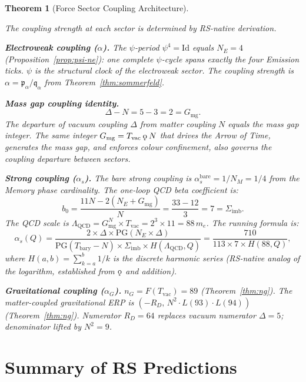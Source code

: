 \documentclass[11pt,letterpaper]{article}
\theoremstyle{plain}
\newtheorem{theorem}{Theorem}[section]
\theoremstyle{definition}
\theoremstyle{remark}
\newcommand{\koppa}{\mathbin{\text{\rm\k{o}}}}
\newcommand{\Tbary}{T_{\mathrm{bary}}}
\newcommand{\Sigimb}{\Sigma_{\mathrm{imb}}}
\newcommand{\PG}{\mathrm{PG}}
\newcommand{\Gmg}{G_{\mathrm{mg}}}
\newcommand{\Tvac}{T_{\mathrm{vac}}}
\newcommand{\nG}{n_G}
\newcommand{\pa}{\mathfrak{p}_\alpha}
\newcommand{\qa}{\mathfrak{q}_\alpha}
\newcommand{\RD}{R_D}
\newcommand{\FibN}[1]{F(#1)}
\newcommand{\alphaSbare}{\alpha_s^{\mathrm{bare}}}
\begin{document}
\begin{theorem}[Force Sector Coupling Architecture]\label{thm:force-coupling}
\begin{rsbox}
The coupling strength at each sector is determined by RS-native
derivation.

\medskip\noindent\textbf{Electroweak coupling ($\alpha$).}
The $\psi$-period $\psi^4=\mathrm{Id}$ equals $N_E=4$
(Proposition~\ref{prop:psi-ne}): one complete $\psi$-cycle spans
exactly the four Emission ticks.  $\psi$ is the structural clock of
the electroweak sector.  The coupling strength is $\alpha=\pa/\qa$
from Theorem~\ref{thm:sommerfeld}.

\medskip\noindent\textbf{Mass gap coupling identity.}
\[
\Delta-N=5-3=2=\Gmg.
\]
The departure of vacuum coupling $\Delta$ from matter coupling $N$
equals the mass gap integer.  The same integer $\Gmg=\Tvac\koppa N$
that drives the Arrow of Time, generates the mass gap, and enforces
colour confinement, also governs the coupling departure between
sectors.

\medskip\noindent\textbf{Strong coupling ($\alpha_s$).}
The bare strong coupling is $\alphaSbare=1/N_M=1/4$ from the Memory
phase cardinality.  The one-loop QCD beta coefficient is:
\[
b_0=\frac{11N-2(N_E+\Gmg)}{N}=\frac{33-12}{3}=7=\Sigimb.
\]
The QCD scale is $\Lambda_{\mathrm{QCD}}=\Gmg^N\times\Tvac=2^3\times11
=88\,m_e$.  The running formula is:
\[
\alpha_s(Q)=\frac{2\times\Delta\times\PG(N_E\times\Delta)}
  {\PG(\Tbary-N)\times\Sigimb\times H(\Lambda_{\mathrm{QCD}},Q)}
  =\frac{710}{113\times7\times H(88,Q)},
\]
where $H(a,b)=\sum_{k=a}^{b}1/k$ is the discrete harmonic series
(RS-native analog of the logarithm, established from $\koppa$ and
addition).

\medskip\noindent\textbf{Gravitational coupling ($\alpha_G$).}
$\nG=\FibN{\Tvac}=89$ (Theorem~\ref{thm:ng}).  The matter-coupled
gravitational ERP is $(-\RD,\,N^2\cdot L(93)\cdot L(94))$
(Theorem~\ref{thm:ng}).  Numerator $\RD=64$ replaces vacuum
numerator $\Delta=5$; denominator lifted by $N^2=9$.
\end{rsbox}
\end{theorem}

\section{Summary of RS Predictions}\label{sec:summary}
\end{document}
